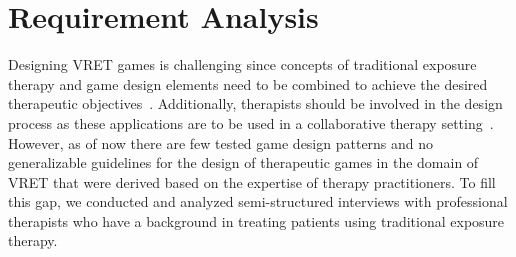 \section{Requirement Analysis}
\label{sec:req_analysis}
Designing \ac{VRET} games is challenging since concepts of traditional exposure therapy and game design elements need to be combined %
to achieve the desired therapeutic objectives~\cite{birk2019,mandryk2017}. Additionally, therapists should be involved in the design process as these applications are to be used in a collaborative therapy setting~\cite{fleming2016}. However, as of now there are few tested game design patterns and no generalizable guidelines for the design of therapeutic games in the domain of \ac{VRET} that were derived based on the expertise of therapy practitioners. 
To fill this gap, we conducted and analyzed semi-structured interviews with professional therapists who have a background in treating patients using traditional exposure therapy. 

